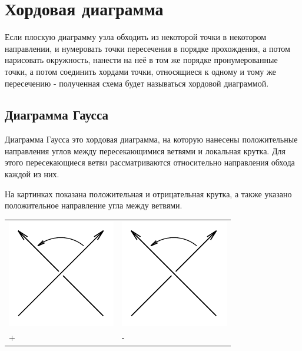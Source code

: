 \section{Хордовая диаграмма}

Если плоскую диаграмму узла обходить из некоторой точки в некотором направлении, и нумеровать точки пересечения в порядке прохождения, а потом нарисовать окружность, нанести на неё в том же порядке пронумерованные точки, а потом соединить хордами точки, относящиеся к одному и тому же пересечению - полученная схема будет называться хордовой диаграммой.

\subsection{Диаграмма Гаусса}

Диаграмма Гаусса это хордовая диаграмма, на которую нанесены положительные направления углов между пересекающимися ветвями и локальная крутка. Для этого пересекающиеся ветви рассматриваются относительно направления обхода каждой из них.

На картинках показана положительная и отрицательная крутка, а также указано положительное направление угла между ветвями.

\graphicspath{{\currentpath}}

\begin{tabular}{
>{\centering\arraybackslash}m{3cm}
>{\centering\arraybackslash}m{3cm}
}
\includegraphics{images/crossing-right.pdf}
&
\includegraphics{images/crossing-left.pdf}
\\
+ & -
\end{tabular}


